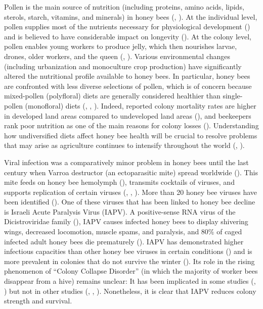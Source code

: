 \documentclass[11pt,a4paper,oldfontcommands,openany]{memoir}
\numberwithin{equation}{section} %
\begin{document}
Pollen is the main source of nutrition (including proteins, amino acids, lipids, sterols, starch, vitamins, and minerals) in honey bees (\citealt{source}, \citealt{source2}). At the individual level, pollen supplies most of the nutrients necessary for physiological development (\citealt{brodschneider}) and is believed to have considerable impact on longevity (\citealt{longevity}). At the colony level, pollen enables young workers to produce jelly, which then nourishes larvae, drones, older workers, and the queen (\citealt{jelly}, \citealt{jelly2}). Various environmental changes (including urbanization and monoculture crop production) have significantly altered the nutritional profile available to honey bees. In particular, honey bees are confronted with less diverse selections of pollen, which is of concern because mixed-pollen (polyfloral) diets are generally considered healthier than single-pollen (monofloral) diets (\citealt{diverse}, \citealt{diverse2}, \citealt{alaux}). Indeed, reported colony mortality rates are higher in developed land areas compared to undeveloped land areas (\citealt{undeveloped}), and beekeepers rank poor nutrition as one of the main reasons for colony losses (\citealt{bkLoss}). Understanding how undiversified diets affect honey bee health will be crucial to resolve problems that may arise as agriculture continues to intensify throughout the world (\citealt{ag}, \citealt{ag2}).

Viral infection was a comparatively minor problem in honey bees until the last century when Varroa destructor (an ectoparasitic mite) spread worldwide (\citealt{miteSpread}). This mite feeds on honey bee hemolymph (\citealt{hemolymph}), transmits cocktails of viruses, and supports replication of certain viruses (\citealt{miteVirus}, \citealt{miteVirus2}, \citealt{miteVirus3}). More than 20 honey bee viruses have been identified (\citealt{numVirus}). One of these viruses that has been linked to honey bee decline is Israeli Acute Paralysis Virus (IAPV). A positive-sense RNA virus of the Dicistroviridae family (\citealt{fam}), IAPV causes infected honey bees to display shivering wings, decreased locomotion, muscle spams, and paralysis, and 80\% of caged infected adult honey bees die prematurely (\citealt{symptoms}). IAPV has demonstrated higher infectious capacities than other honey bee viruses in certain conditions (\citealt{carrillo}) and is more prevalent in colonies that do not survive the winter (\citealt{winter}). Its role in the rising phenomenon of ``Colony Collapse Disorder'' (in which the majority of worker bees disappear from a hive) remains unclear: It has been implicated in some studies (\citealt{iapvCCD}, \citealt{iapvCCD2}) but not in other studies (\citealt{ccd1}, \citealt{iapvCCD3}, \citealt{fam}). Nonetheless, it is clear that IAPV reduces colony strength and survival.
\end{document}
